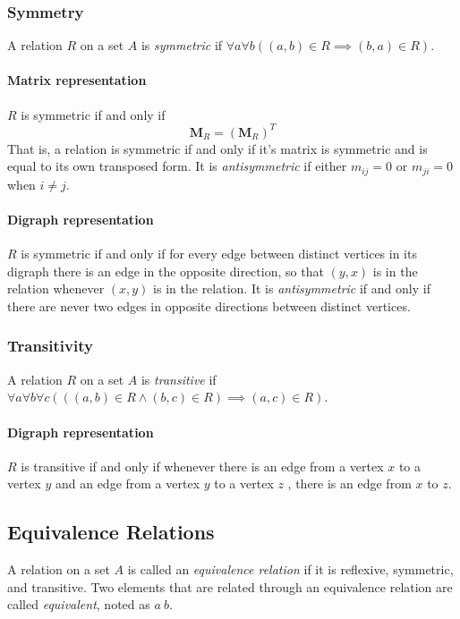 \subsubsection{Symmetry} A relation \( R \) on a set \( A \) is \emph{symmetric}  if \( \forall a \forall b ((a,b) \in R \implies (b,a) \in R)\).

\paragraph{Matrix representation}
\( R \) is symmetric if and only if \[
	\mathbf{M}_{R} = (\mathbf{M}_{R})^T
\]
That is, a relation is symmetric if and only if it's matrix is symmetric and is equal to its own transposed form. It is \emph{antisymmetric} if either \( m_{ij} =0 \) or \( m_{ji} = 0 \) when \( i \neq j \).

\paragraph{Digraph representation}
\( R \) is symmetric if and only if for every edge between distinct vertices in its digraph there is an edge in the opposite direction, so that \( (y,x) \) is in the relation whenever \( (x,y) \) is in the relation. It is \emph{antisymmetric} if and only if there are never two edges in opposite directions between distinct vertices.

\subsubsection{Transitivity} A relation \( R \) on a set \( A \) is \emph{transitive} if \( \forall a \forall b \forall c (((a,b) \in R \wedge (b,c) \in R) \implies (a,c) \in R) \).   

\paragraph{Digraph representation}
\( R \) is transitive if and only if whenever there is an edge from a vertex \( x \) to a vertex \( y \) and an edge from a vertex \( y \) to a vertex \( z \) , there is an edge from \( x \)  to \( z \).

\subsection{Equivalence Relations}
A relation on a set \( A \) is called an \emph{equivalence relation} if it is reflexive, symmetric, and transitive. Two elements that are related through an equivalence relation are called \emph{equivalent}, noted as \( a ~ b \).

